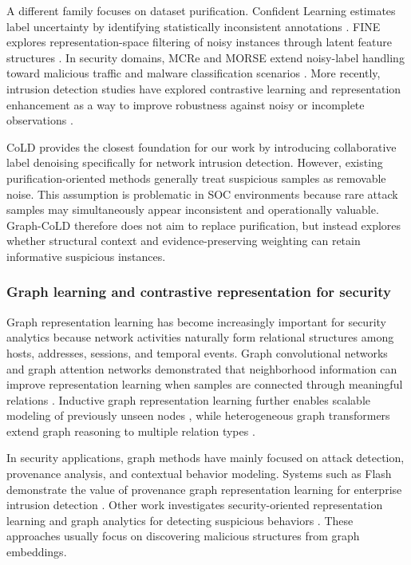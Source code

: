 \documentclass[preprint,3p,times]{elsarticle}
\begin{document}
A different family focuses on dataset purification. Confident Learning estimates
label uncertainty by identifying statistically inconsistent annotations
\cite{northcutt2021confident}. FINE explores representation-space filtering of
noisy instances through latent feature structures
\cite{kim2021fine}. In security domains, MCRe and MORSE extend noisy-label
handling toward malicious traffic and malware classification scenarios
\cite{yuan2023mcre,wu2023morse}. More recently, intrusion detection studies
have explored contrastive learning and representation enhancement as a way to
improve robustness against noisy or incomplete observations
\cite{wang2022feco,yue2022cleid}.

CoLD provides the closest foundation for our work by introducing collaborative
label denoising specifically for network intrusion detection. However, existing
purification-oriented methods generally treat suspicious samples as removable
noise. This assumption is problematic in SOC environments because rare attack
samples may simultaneously appear inconsistent and operationally valuable.
Graph-CoLD therefore does not aim to replace purification, but instead explores
whether structural context and evidence-preserving weighting can retain
informative suspicious instances.

\subsubsection*{Graph learning and contrastive representation for security}

Graph representation learning has become increasingly important for security
analytics because network activities naturally form relational structures among
hosts, addresses, sessions, and temporal events. Graph convolutional networks
and graph attention networks demonstrated that neighborhood information can
improve representation learning when samples are connected through meaningful
relations \cite{kipf2017gcn,velickovic2018gat}. Inductive graph representation
learning further enables scalable modeling of previously unseen nodes
\cite{hamilton2017graphsage}, while heterogeneous graph transformers extend
graph reasoning to multiple relation types \cite{hu2020hgt}.

In security applications, graph methods have mainly focused on attack
detection, provenance analysis, and contextual behavior modeling. Systems such
as Flash demonstrate the value of provenance graph representation learning for
enterprise intrusion detection \cite{rehman2024flash}. Other work investigates
security-oriented representation learning and graph analytics for detecting
suspicious behaviors \cite{xu2024argus}. These approaches usually focus on
discovering malicious structures from graph embeddings.
\end{document}
